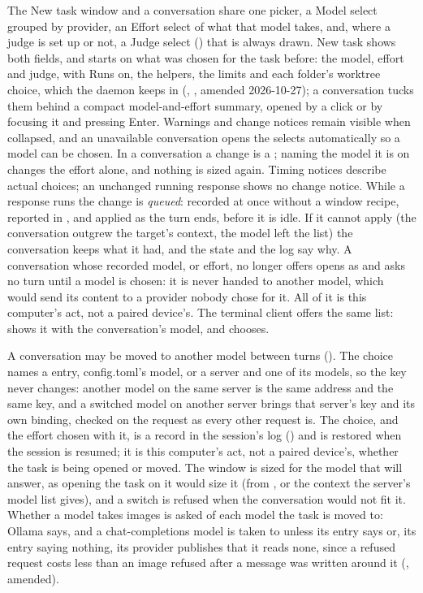 The New task window and a conversation share one picker, a Model select
grouped by provider, an Effort select of what that model takes, and, where a
judge is set up or not, a Judge select () that is always drawn. New task
shows both fields, and starts on what was chosen for the task before: the
model, effort and judge, with Runs on, the helpers, the limits and each
folder's worktree choice, which the daemon keeps in 
(, , amended 2026-10-27); a conversation tucks them behind a compact model-and-effort
summary, opened by a click or by focusing it and pressing Enter. Warnings and
change notices remain visible when collapsed, and an unavailable conversation
opens the selects automatically so a model can be chosen. In a
conversation a change is a ; naming the model it is on
changes the effort alone, and nothing is sized again. Timing notices describe
actual choices; an unchanged running response shows no change notice.
While a response runs the
change is \emph{queued}: recorded at once without a window recipe, reported in
, and applied as the turn ends, before it is idle. If it
cannot apply (the conversation outgrew the target's context, the model left the
list) the conversation keeps what it had, and the state and the log say why.
A conversation whose recorded model, or effort,  no longer
offers opens as  and asks no turn until a model is chosen: it
is never handed to another model, which would send its content to a provider
nobody chose for it. All of it is this computer's act, not a paired
device's. The terminal client offers the same list:  shows it
with the conversation's model, and  chooses.

A conversation may be moved to another model between turns
(). The choice names a  entry, config.toml's
\code{[control]} model, or a server and one of its models, so the key
never changes: another model on the same server is the same address and the
same key, and a switched model on another server brings that server's key
and its own binding, checked on the request as every other request is. The
choice, and the effort chosen with it, is a record in the session's log
() and is restored when the session is resumed; it is this
computer's act, not a paired device's, whether the task is being opened or
moved. The window is sized for the model that will answer, as opening the task
on it would size it (from , or the context the server's model
list gives), and a switch is refused when the conversation would not fit it.
Whether a model takes images is asked of each model the task is moved to: Ollama
says, and a chat-completions model is taken to unless its entry says
 or, its entry saying nothing, its provider publishes
that it reads none, since a refused request costs less than an image
refused after a message was written around it (, amended).


